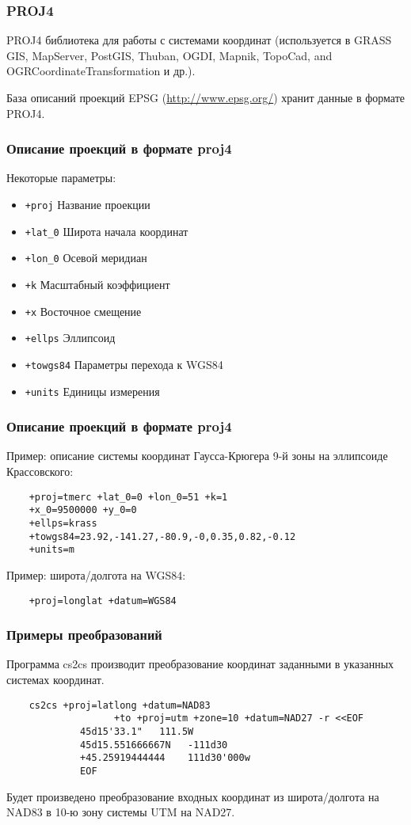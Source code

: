 
\begin{frame}
    \frametitle{PROJ4}
    PROJ4 библиотека для работы с системами координат (используется в GRASS GIS,  MapServer,  PostGIS,  Thuban,  OGDI,  Mapnik,  TopoCad, and  OGRCoordinateTransformation и др.).

    База описаний проекций EPSG (\url{http://www.epsg.org/}) хранит данные в формате PROJ4.
\end{frame}

\begin{frame}[fragile]
    \frametitle{Описание проекций в формате proj4}
    Некоторые параметры:
    \begin{itemize}
        \item \verb!+proj! Название проекции
        \item \verb!+lat_0! Широта начала координат
        \item \verb!+lon_0! Осевой меридиан
        \item \verb!+k! Масштабный коэффициент
        \item \verb!+x! Восточное смещение
        \item \verb!+ellps! Эллипсоид
        \item \verb!+towgs84! Параметры перехода к WGS84
        \item \verb!+units! Единицы измерения
    \end{itemize}


\end{frame}

\begin{frame}[fragile]
    \frametitle{Описание проекций в формате proj4}
    Пример: описание системы координат Гаусса-Крюгера 9-й зоны на эллипсоиде Крассовского:
    \begin{verbatim}
    +proj=tmerc +lat_0=0 +lon_0=51 +k=1
    +x_0=9500000 +y_0=0
    +ellps=krass
    +towgs84=23.92,-141.27,-80.9,-0,0.35,0.82,-0.12
    +units=m
    \end{verbatim}

    Пример: широта/долгота на WGS84:
    \begin{verbatim}
    +proj=longlat +datum=WGS84
    \end{verbatim}
\end{frame}

\begin{frame}[fragile]
    \frametitle{Примеры преобразований}
    Программа cs2cs производит преобразование координат
    заданными в указанных системах координат.
    \begin{verbatim}
    cs2cs +proj=latlong +datum=NAD83
                   +to +proj=utm +zone=10 +datum=NAD27 -r <<EOF
             45d15'33.1"   111.5W
             45d15.551666667N   -111d30
             +45.25919444444    111d30'000w
             EOF
    \end{verbatim}
    Будет произведено преобразование входных координат из широта/долгота на NAD83
     в 10-ю зону системы UTM на NAD27.
\end{frame}

